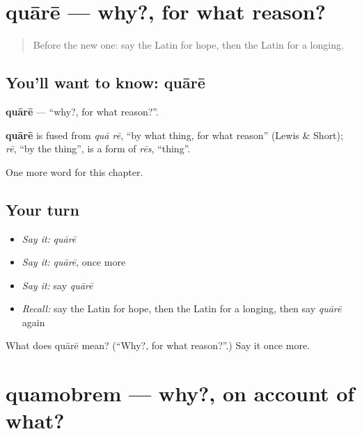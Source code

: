 \section[quārē]{quārē — why?, for what reason?}

\label{lesson:LA-C112-quare}



\begin{quote}
Before the new one: say the Latin for hope, then the Latin for a longing.
\end{quote}

\subsection*{You'll want to know: quārē}
\textbf{quārē} — \textquotedblleft{}why?, for what reason?\textquotedblright{}.

\begin{cousinweb}
\textbf{quārē} is fused from \emph{quā rē}, \textquotedblleft{}by what thing, for what reason\textquotedblright{} (Lewis \& Short); \emph{rē}, \textquotedblleft{}by the thing\textquotedblright{}, is a form of \emph{rēs}, \textquotedblleft{}thing\textquotedblright{}.
\end{cousinweb}

\begin{grammarlens}[title={What you've built}]
One more word for this chapter.
\end{grammarlens}

\subsection*{Your turn}
\begin{itemize}
\raggedright
  \item \emph{Say it:} \emph{quārē}
  \item \emph{Say it:} \emph{quārē}, once more
  \item \emph{Say it:} say \emph{quārē}
  \item \emph{Recall:} say the Latin for hope, then the Latin for a longing, then say \emph{quārē} again
\end{itemize}

\begin{tcolorbox}[breakable,colback=teal!4,colframe=teal!35!black,title={Before you move on}]
What does quārē mean? (\textquotedblleft{}Why?, for what reason?\textquotedblright{}.) Say it once more.
\end{tcolorbox}
\section[quamobrem]{quamobrem — why?, on account of what?}


